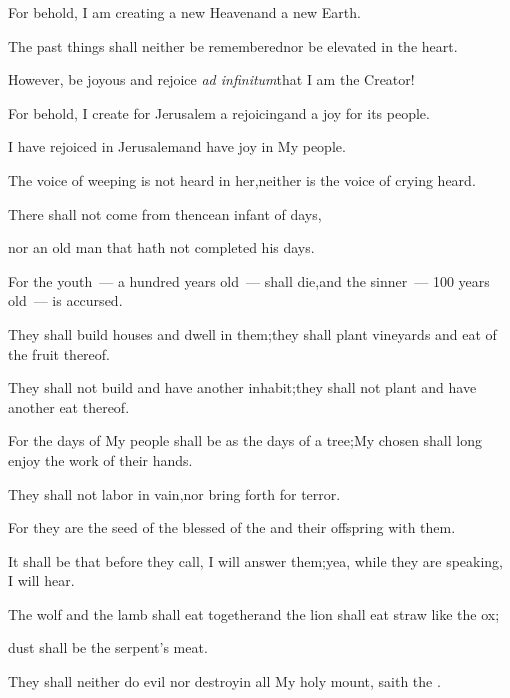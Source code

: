 
\begin{inparaenum}
  \pa{} For behold, I am creating a new Heaven\pa{}and a new Earth.%

  \pb{}The past things shall neither be remembered\pa{}nor be elevated in the heart.%

  \pb{} However, be joyous and rejoice \textit{ad infinitum}\pa{}that I am the Creator!%

  \pb{}For behold, I create for Jerusalem a rejoicing\pa{}and a joy for its people.%

  \pb{} I have rejoiced in Jerusalem\pa{}and have joy in My people.%

  \pb{}The voice of weeping is not heard in her,\pa{}neither is the voice of crying heard.%

  \pb{} There shall not come from thence\pa{}an infant of days,%

  \pb{}nor an old man that hath not completed his days.%

  \pb{}For the youth~--- a hundred years old~--- shall die,\pa{}and the sinner~--- 100 years old~--- is accursed.%

  \pc{} They shall build houses and dwell in them;\pa{}they shall plant vineyards and eat of the fruit thereof.%

  \pb{} They shall not build and have another inhabit;\pa{}they shall not plant and have another eat thereof.%

  \pb{}For the days of My people shall be as the days of a tree;\pa{}My chosen shall long enjoy the work of their hands.%

  \pb{} They shall not labor in vain,\pa{}nor bring forth for terror.%

  \pb{}For they are the seed of the blessed of the \lord\pa{}and their offspring with them.%

  \pb{} It shall be that before they call, I will answer them;\pa{}yea, while they are speaking, I will hear.%

  \pb{} The wolf and the lamb shall eat together\pa{}and the lion shall eat straw like the ox;%

  \pb{}dust shall be the serpent's meat.%

  \pb{}They shall neither do evil nor destroy\pa{}in all My holy mount, saith the \lord.%
\end{inparaenum}
